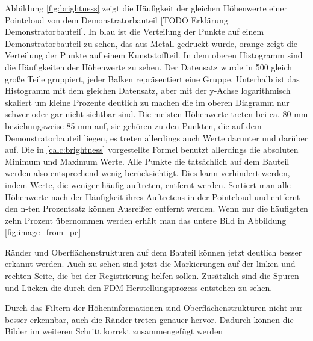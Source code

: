 Abbildung \ref*{fig:brightness} zeigt die Häufigkeit der gleichen Höhenwerte einer
Pointcloud von dem Demonstratorbauteil [TODO Erklärung Demonstratorbauteil]. In blau ist die Verteilung der Punkte auf 
einem Demonstratorbauteil zu sehen, das aus Metall gedruckt wurde, orange zeigt die 
Verteilung der Punkte auf einem Kunststoffteil.
In dem oberen Histogramm 
sind die Häufigkeiten der Höhenwerte zu sehen. Der Datensatz wurde in 500 gleich große
Teile gruppiert, jeder Balken repräsentiert eine Gruppe.
Unterhalb ist das Histogramm mit dem gleichen Datensatz, aber mit der y-Achse 
logarithmisch skaliert um kleine Prozente deutlich zu machen die im
oberen Diagramm nur schwer oder gar nicht sichtbar sind. 
Die meisten Höhenwerte treten bei ca. 80 mm beziehungsweise 85 mm auf, 
sie gehören zu den Punkten, die auf dem Demonstratorbauteil liegen, 
es treten allerdings auch Werte darunter und darüber auf. 
Die in \ref*{calc:brightness} vorgestellte Formel benutzt allerdings 
die absoluten Minimum und Maximum Werte.
Alle Punkte die tatsächlich auf dem Bauteil werden also entsprechend wenig
berücksichtigt. Dies kann verhindert werden, indem Werte, die weniger häufig 
auftreten, entfernt werden. Sortiert man alle Höhenwerte nach der Häufigkeit ihres 
Auftretens in der Pointcloud und entfernt den n-ten Prozentsatz können Ausreißer 
entfernt werden. Wenn nur die häufigsten zehn Prozent übernommen werden erhält man 
das untere Bild in Abbildung \ref{fig:image_from_pc}

Ränder und Oberflächenstrukturen auf dem Bauteil können jetzt deutlich besser erkannt werden. Auch zu sehen
sind jetzt die Markierungen auf der linken und rechten Seite, die bei der Registrierung
helfen sollen. Zusätzlich sind die Spuren und Lücken die durch den FDM 
Herstellungsprozess entstehen zu sehen.

Durch das Filtern der Höheninformationen sind Oberflächenstrukturen nicht nur besser
erkennbar, auch die Ränder treten genauer hervor. 
Dadurch können die Bilder im weiteren Schritt korrekt zusammengefügt werden


